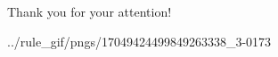 \documentclass[xcolor=dvipsnames]{beamer}
\begin{document}
\begin{frame}{}
  \begin{minipage}[h]{.3\linewidth}
    {\bf \Large
      \begin{center}
        Thank you for your attention!
      \end{center}}
  \end{minipage}
  \begin{minipage}[h]{.68\linewidth}
      {../rule_gif/pngs/17049424499849263338_3-}{0}{173}
  \end{minipage}
\end{frame}
\end{document}
